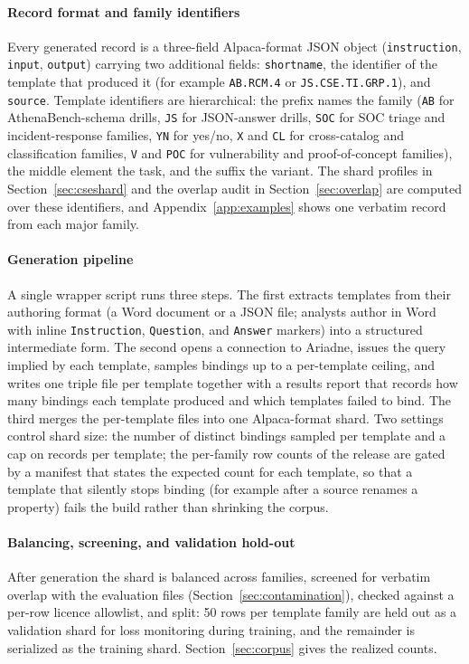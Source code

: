 \documentclass[twocolumn]{svjour3}
\begin{document}
\paragraph{Record format and family identifiers}
Every generated record is a three-field Alpaca-format JSON object (\texttt{instruction}, \texttt{input}, \texttt{output}) carrying two additional fields: \texttt{shortname}, the identifier of the template that produced it (for example \texttt{AB.RCM.4} or \texttt{JS.CSE.TI.GRP.1}), and \texttt{source}. Template identifiers are hierarchical: the prefix names the family (\texttt{AB} for AthenaBench-schema drills, \texttt{JS} for JSON-answer drills, \texttt{SOC} for SOC triage and incident-response families, \texttt{YN} for yes/no, \texttt{X} and \texttt{CL} for cross-catalog and classification families, \texttt{V} and \texttt{POC} for vulnerability and proof-of-concept families), the middle element the task, and the suffix the variant. The shard profiles in Section~\ref{sec:cseshard} and the overlap audit in Section~\ref{sec:overlap} are computed over these identifiers, and Appendix~\ref{app:examples} shows one verbatim record from each major family.

\paragraph{Generation pipeline}
A single wrapper script runs three steps. The first extracts templates from their authoring format (a Word document or a JSON file; analysts author in Word with inline \texttt{Instruction}, \texttt{Question}, and \texttt{Answer} markers) into a structured intermediate form. The second opens a connection to Ariadne, issues the query implied by each template, samples bindings up to a per-template ceiling, and writes one triple file per template together with a results report that records how many bindings each template produced and which templates failed to bind. The third merges the per-template files into one Alpaca-format shard. Two settings control shard size: the number of distinct bindings sampled per template and a cap on records per template; the per-family row counts of the release are gated by a manifest that states the expected count for each template, so that a template that silently stops binding (for example after a source renames a property) fails the build rather than shrinking the corpus.

\paragraph{Balancing, screening, and validation hold-out}
After generation the shard is balanced across families, screened for verbatim overlap with the evaluation files (Section~\ref{sec:contamination}), checked against a per-row licence allowlist, and split: 50 rows per template family are held out as a validation shard for loss monitoring during training, and the remainder is serialized as the training shard. Section~\ref{sec:corpus} gives the realized counts.
\end{document}
